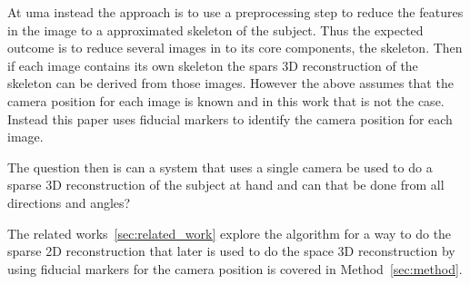 At \ac{uma} instead the approach is to use a preprocessing step to reduce the features in the image to a approximated skeleton of the subject.
Thus the expected outcome is to reduce several images in to its core components, the skeleton.
Then if each image contains its own skeleton the spars 3D reconstruction of the skeleton can be derived from those images.
However the above assumes that the camera position for each image is known and in this work that is not the case.
Instead this paper uses fiducial markers to identify the camera position for each image.

The question then is can a system that uses a single camera be used to do a sparse 3D reconstruction of the subject at hand and can that be done from all directions and angles?

The related works~\ref{sec:related_work} explore the \openpose algorithm for a way to do the sparse 2D reconstruction that later is used to do the space 3D reconstruction by using fiducial markers for the camera position is covered in Method~\ref{sec:method}.















